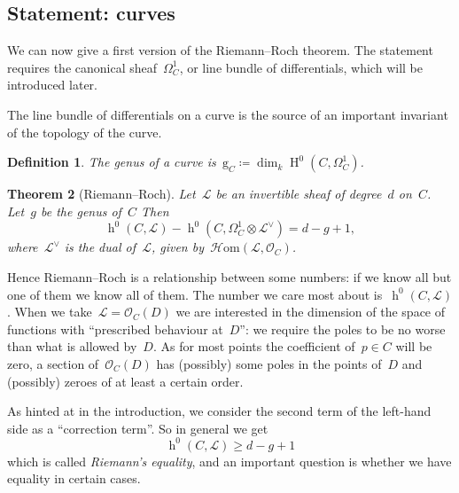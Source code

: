 \documentclass[10pt,a4paper]{article}
\theoremstyle{lecture}
\newtheorem{theorem}{Theorem}
\newtheorem{definition}[theorem]{Definition}
\DeclareMathOperator\hh{h}
\DeclareMathOperator\HH{H}
\begin{document}
\subsection{Statement: curves}
\label{subsection:statement-curves}
We can now give a first version of the Riemann--Roch theorem. The statement requires the canonical sheaf~$\Omega_C^1$, or line bundle of differentials, which will be introduced later.

The line bundle of differentials on a curve is the source of an important invariant of the topology of the curve.
\begin{definition}
  The \emph{genus} of a curve is~$\mathrm{g}_C\coloneqq\dim_k\HH^0(C,\Omega_C^1)$.
\end{definition}
\begin{theorem}[Riemann--Roch]
  \label{theorem:riemann-roch}
  Let~$\mathcal{L}$ be an invertible sheaf of degree~$d$ on~$C$. Let~$g$ be the genus of~$C$ Then
  \begin{equation}
    \hh^0(C,\mathcal{L})-\hh^0(C,\Omega_C^1\otimes\mathcal{L}^\vee)=d-g+1,
  \end{equation}
  where~$\mathcal{L}^\vee$ is the dual of~$\mathcal{L}$, given by~$\mathcal{H}\mathrm{om}(\mathcal{L},\mathcal{O}_C)$.
\end{theorem}
Hence Riemann--Roch is a relationship between some numbers: if we know all but one of them we know all of them. The number we care most about is~$\hh^0(C,\mathcal{L})$. When we take~$\mathcal{L}=\mathcal{O}_C(D)$ we are interested in the dimension of the space of functions with ``prescribed behaviour at~$D$'': we require the poles to be no worse than what is allowed by~$D$. As for most points the coefficient of~$p\in C$ will be zero, a section of~$\mathcal{O}_C(D)$ has (possibly) some poles in the points of~$D$ and (possibly) zeroes of at least a certain order.

As hinted at in the introduction, we consider the second term of the left-hand side as a ``correction term''. So in general we get
\begin{equation}
  \hh^0(C,\mathcal{L})\geq d-g+1
\end{equation}
which is called \emph{Riemann's equality}, and an important question is whether we have equality in certain cases.
\end{document}
